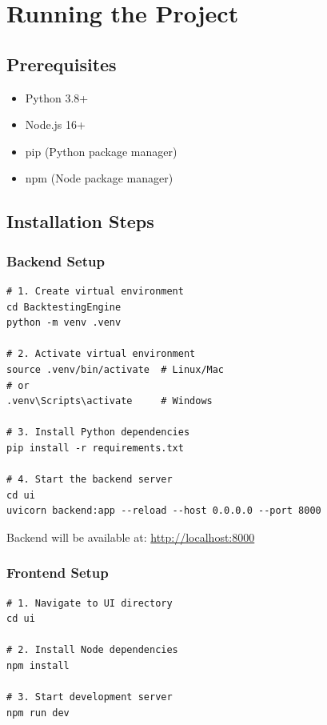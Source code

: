 \documentclass[11pt,a4paper]{article}
\begin{document}
\section{Running the Project}

\subsection{Prerequisites}

\begin{itemize}
  \item Python 3.8+
  \item Node.js 16+
  \item pip (Python package manager)
  \item npm (Node package manager)
\end{itemize}

\subsection{Installation Steps}

\subsubsection{Backend Setup}

\begin{lstlisting}[style=shellcode]
# 1. Create virtual environment
cd BacktestingEngine
python -m venv .venv

# 2. Activate virtual environment
source .venv/bin/activate  # Linux/Mac
# or
.venv\Scripts\activate     # Windows

# 3. Install Python dependencies
pip install -r requirements.txt

# 4. Start the backend server
cd ui
uvicorn backend:app --reload --host 0.0.0.0 --port 8000
\end{lstlisting}

Backend will be available at: \url{http://localhost:8000}

\subsubsection{Frontend Setup}

\begin{lstlisting}[style=shellcode]
# 1. Navigate to UI directory
cd ui

# 2. Install Node dependencies
npm install

# 3. Start development server
npm run dev
\end{lstlisting}
\end{document}
